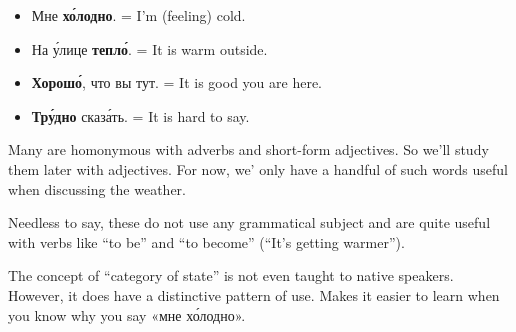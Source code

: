 \begin{itemize}
\tightlist
\item
  Мне \textbf{х\'{о}лодно}. = I'm (feeling) cold.
\item
  На \'{у}лице \textbf{тепл\'{о}}. = It is warm outside.
\item
  \textbf{Хорош\'{о}}, что вы тут. = It is good you are here.
\item
  \textbf{Тр\'{у}дно} сказ\'{а}ть. = It is hard to say.
\end{itemize}

Many are homonymous with adverbs and short-form adjectives. So we'll
study them later with adjectives. For now, we' only have a handful of
such words useful when discussing the weather.

Needless to say, these do not use any grammatical subject and are quite
useful with verbs like ``to be'' and ``to become'' (``It's getting
warmer'').

The concept of ``category of state'' is not even taught to native
speakers. However, it does have a distinctive pattern of use. Makes it
easier to learn when you know why you say «мне х\'{о}лодно».
